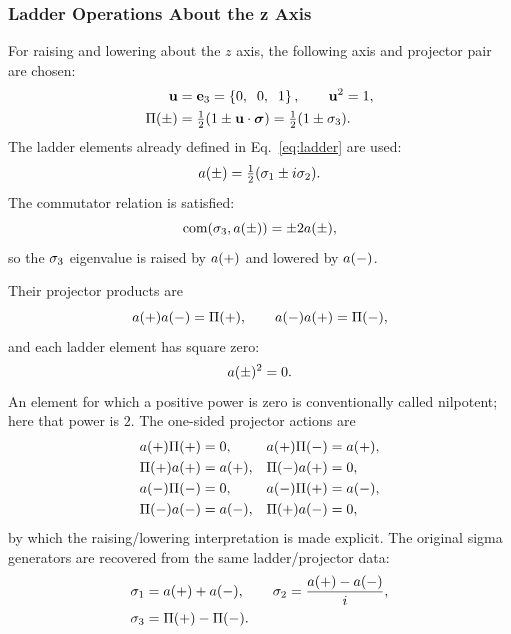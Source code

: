 \subsubsection{Ladder Operations About the z Axis}
For raising and lowering about the \(z\) axis, the following axis and
projector pair are chosen:
\begin{equation*}
\begin{aligned}
\mathbf{u}&=\mathbf{e}_3=\left\{0,\mkern10mu 0,\mkern10mu 1\right\},
\qquad
\mathbf{u}^2=1,
\\
\Pi(\pm)&
=\tfrac12(1\pm\mathbf{u}\cdot\mathbf{\bm{\sigma}})
=\tfrac12(1\pm \sigma_3).
\end{aligned}
\end{equation*}
The ladder elements already defined in Eq.\ \eqref{eq:ladder} are used:
\begin{equation*}
a(\pm)=\tfrac12(\sigma_1\pm i\sigma_2).
\end{equation*}
The commutator relation is satisfied:
\begin{equation*}
\operatorname{com}\!\left(\sigma_3,a(\pm)\right)=\pm 2a(\pm),
\end{equation*}
so the \(\sigma_3\) eigenvalue is raised by \(a(+)\) and lowered
by \(a(-)\).

Their projector products are
\begin{equation*}
a(+)a(-)=\Pi(+),
\qquad
a(-)a(+)=\Pi(-),
\end{equation*}
and each ladder element has square zero:
\begin{equation*}
a(\pm)^2=0.
\end{equation*}
An element for which a positive power is zero is conventionally called
nilpotent; here that power is \(2\).
The one-sided projector actions are
\begin{equation*}
\begin{aligned}
a(+)\Pi(+) &= 0, &
a(+)\Pi(-) &= a(+), \\
\Pi(+)a(+) &= a(+), &
\Pi(-)a(+) &= 0, \\
a(-)\Pi(-) &= 0, &
a(-)\Pi(+) &= a(-), \\
\Pi(-)a(-) &= a(-), &
\Pi(+)a(-) &= 0,
\end{aligned}
\end{equation*}
by which the raising/lowering interpretation is made explicit. The original
sigma generators are recovered from the same ladder/projector data:
\begin{equation*}
\begin{aligned}
\sigma_1&=a(+)+a(-),\qquad
\sigma_2=\frac{a(+)-a(-)}{i},\\
\sigma_3&=\Pi(+)-\Pi(-).
\end{aligned}
\end{equation*}

